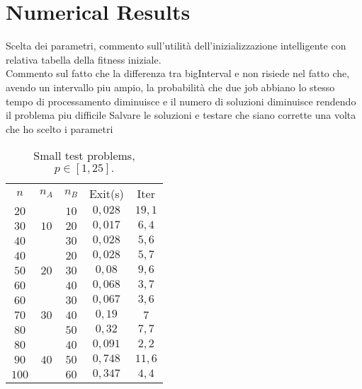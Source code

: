 \documentclass[opre,nonblindrev]{informs3} %
\begin{document}
\section{Numerical Results}
Scelta dei parametri, commento sull'utilità dell'inizializzazione intelligente con relativa tabella della fitness iniziale. \\
Commento sul fatto che la differenza tra bigInterval e non risiede nel fatto che, avendo un intervallo piu ampio, la probabilità che due job abbiano lo stesso tempo di processamento diminuisce e il numero di soluzioni diminuisce rendendo il problema piu difficile
Salvare le soluzioni e testare che siano corrette una volta che ho scelto i parametri
\begin{table}[h]\scriptsize
	\begin{center}
		\begin{tabular}{|| c |c | c|| c||c ||}\hline
			
			\multirow{3}{*}{$n$} & \multirow{3}{*}{$n_A$} & \multirow{3}{*}{$n_B$} & \multirow{3}{*}{Exit(s)} & \multirow{3}{*}{Iter}\\
			&  &&  & \\
			&    &    &  &\\\hline
			$20$	 & \multirow{3}{*}{$10$}   & $10$   &$0,028$  & $19,1$
			\\
			$30$  &  & $20$	 & $0,017$
			&$6,4$
			\\ 
			$40$  &  & $30$	 & $0,028$
			&$5,6$
			\\ \hline
			
			$40$	 & \multirow{3}{*}{$20$}   & $20$   & $0,028$
			& $5,7$
			\\
			$50$  &  & $30$	 &$0,08$
			&$9,6$
			\\ 
			$60$  &  & $40$	 &$0,068$ &$3,7$\\ \hline
			
			$60$	 & \multirow{3}{*}{$30$}   & $30$   &  $0,067$
			& $3,6$
			\\
			$70$  &  & $40$	 &$0,19$
			&$7$
			\\ 
			$80$  &  & $50$	 & $0,32$
			&$7,7$
			\\ \hline
			
			$80$	 & \multirow{3}{*}{$40$}   & $40$   &  $0,091$
			&$2,2$
			\\
			$90$  &  & $50$	 & $0,748$
			&$11,6$
			\\ 
			$100$  &  & $60$	 & $0,347$
			&$4,4$
			\\ \hline 
		\end{tabular}
	\end{center}
	\caption{Small test problems, $p \in [1,25].$} \label{large}
\end{table}
\end{document}

